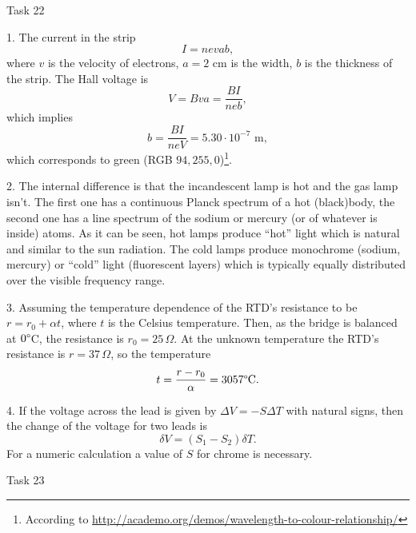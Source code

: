 \documentclass[12pt,a4paper,pdflatex]{disser}
\begin{document}
\begin{center}
\LARGE{Task 22}
\end{center}

\vspace{5mm}

1. The current in the strip
$$
  I=nevab,
$$
where $v$ is the velocity of electrons, $a=2$ cm is the width, $b$ is the thickness of the strip. The Hall voltage is
$$
  V=Bva=\frac{BI}{neb},
$$
which implies
$$
  b=\frac{BI}{neV}=5.30\cdot 10^{-7} \text{ m},
$$
which corresponds to green (RGB $94,255,0$)\footnote{According to \url{http://academo.org/demos/wavelength-to-colour-relationship/}}.

2. The internal difference is that the incandescent lamp is hot and the gas lamp isn't. The first one has a continuous Planck spectrum of a hot (black)body, the second one has a line spectrum of the sodium or mercury (or of whatever is inside) atoms. As it can be seen, hot lamps produce ``hot'' light which is natural and similar to the sun radiation. The cold lamps produce monochrome (sodium, mercury) or ``cold'' light (fluorescent layers) which is typically equally distributed over the visible frequency range.

3. Assuming the temperature dependence of the RTD's resistance to be $r=r_0+\alpha t$, where $t$ is the Celsius temperature. Then, as the bridge is balanced at $0\degree$C, the resistance is $r_0=25\,\Omega$. At the unknown temperature the RTD's resistance is $r=37\,\Omega$, so the temperature
$$
  t=\frac{r-r_0}{\alpha}=3057\degree \text{C}.
$$

4. If the voltage across the lead is given by $\Delta V=-S\Delta T$ with natural signs, then the change of the voltage for two leads is
$$
  \delta V=(S_1-S_2)\delta T.
$$
For a numeric calculation a value of $S$ for chrome is necessary.
\pagebreak

\begin{center}
\LARGE{Task 23}
\end{center}

\vspace{5mm}
\end{document}
